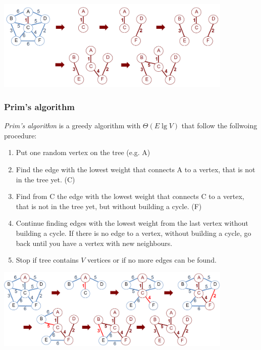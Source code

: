 \begin{center}\includegraphics[width=0.85\textwidth]{img/graphs/KruskalGraph.png}\end{center}

%

\subsubsection{Prim's algorithm}

\emph{Prim's algorithm} is a greedy algorithm with $\Theta(E\lg V)$ that follow the follwoing procedure:

\begin{enumerate}
    \item Put one random vertex on the tree (e.g. A)
    \item Find the edge with the lowest weight that connects A to a vertex, that is not in the tree yet. (C)
    \item Find from C the edge with the lowest weight that connects C to a vertex, that is not in the tree yet, but without building a cycle. (F)
    \item Continue finding edges with the lowest weight from the last vertex without building a cycle. If there is no edge to a vertex, without building a cycle, go back until you have a vertex with new neighbours.
    \item Stop if tree contains $V$ vertices or if no more edges can be found.
\end{enumerate}

\begin{center}\includegraphics[width=0.85\textwidth]{img/graphs/PrimGraph.png}\end{center}

